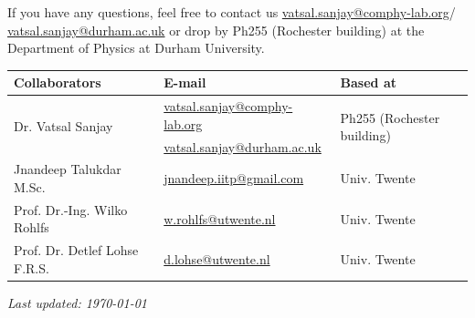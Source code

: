 \documentclass[11pt]{article}
\begin{document}
If you have any questions, feel free to contact us \href{mailto:vatsal.sanjay@comphy-lab.org}{vatsal.sanjay@comphy-lab.org}/\\\href{mailto:vatsal.sanjay@durham.ac.uk}{vatsal.sanjay@durham.ac.uk} or drop by Ph255 (Rochester building) at the Department of Physics at Durham University.

\begin{center}
\begin{tabular}{|l|l|l|}
\hline \textbf{Collaborators} & \textbf{E-mail} & \textbf{Based at} \\
\hline \multirow{2}{*}{Dr. Vatsal Sanjay} & \href{mailto:vatsal.sanjay@comphy-lab.org}{vatsal.sanjay@comphy-lab.org} & \multirow{2}{*}{Ph255 (Rochester building)} \\
& \href{mailto:vatsal.sanjay@durham.ac.uk}{vatsal.sanjay@durham.ac.uk} & \\
\hline Jnandeep Talukdar M.Sc. & \href{mailto:jnandeep.iitp@gmail.com}{jnandeep.iitp@gmail.com} & Univ. Twente \\
\hline Prof. Dr.-Ing. Wilko Rohlfs   & \href{mailto:w.rohlfs@utwente.nl }{w.rohlfs@utwente.nl }& Univ. Twente \\
\hline Prof. Dr. Detlef Lohse F.R.S. & \href{mailto:d.lohse@utwente.nl}{d.lohse@utwente.nl} & Univ. Twente  \\
\hline
\end{tabular}
\end{center}

\vspace{1em}
\noindent\textit{Last updated: \today}

\printbibliography
\end{document}
